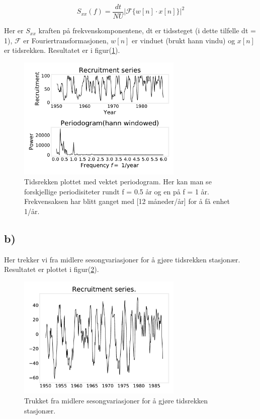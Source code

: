 \begin{equation}
    S_{xx}(f) = \frac{dt}{NU}\bigg |\mathcal{F}\bigg\{w[n]\cdot x[n]\bigg\}\bigg |^{2}
    \label{vektet periodogram}
\end{equation}

Her er $S_{xx}$ kraften på frekvenskomponentene, dt er tidssteget (i dette tilfelle dt = 1), $\mathcal{F}$ er Fouriertransformasjonen, $w[n]$ er vinduet (brukt hann vindu) og $x[n]$ er tidsrekken. Resultatet er i figur(\ref{task_a}).

\begin{figure}[hbt!]
{\centering
    \includegraphics[width=0.70\textwidth]{task_a.pdf}
    \caption{Tidsrekken plottet med vektet periodogram. Her kan man se forskjellige periodisiteter rundt f = 0.5 år og en på f = 1 år. Frekvensaksen har blitt ganget med [12 måneder/år] for å få enhet 1/år.}
    \label{task_a}
\par}
\end{figure}


\subsection{b)}

Her trekker vi fra midlere sesongvariasjoner for å gjøre tidsrekken stasjonær. Resultatet er plottet i figur(\ref{task_b}).

\begin{figure}[hbt!]
    {\centering
        \includegraphics[width=0.70\textwidth]{task_b.pdf}
        \caption{Trukket fra midlere sesongvariasjoner for å gjøre tidsrekken stasjonær.}
        \label{task_b}
    \par}
    \end{figure}


